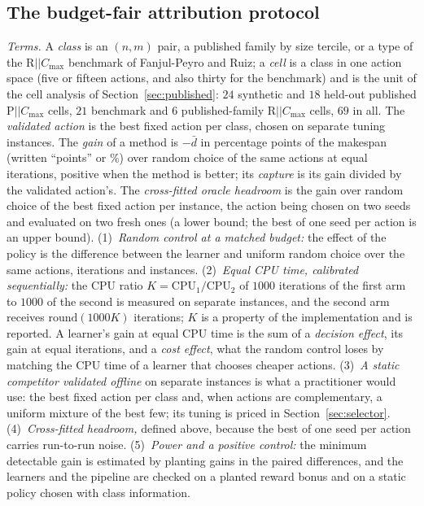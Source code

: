 \documentclass[conference,a4paper]{IEEEtran}
\newcommand{\Cmax}{C_{\max}}
\begin{document}
\subsection{The budget-fair attribution protocol}
\label{sec:protocol}
\emph{Terms.} A \emph{class} is an $(n,m)$ pair, a published family by size tercile, or a type of the R$||\Cmax$ benchmark of Fanjul-Peyro and Ruiz; a \emph{cell} is a class in one action space (five or fifteen actions, and also thirty for the benchmark) and is the unit of the cell analysis of Section~\ref{sec:published}: $24$ synthetic and $18$ held-out published P$||\Cmax$ cells, $21$ benchmark and $6$ published-family R$||\Cmax$ cells, $69$ in all.
The \emph{validated action} is the best fixed action per class, chosen on separate tuning instances. The \emph{gain} of a method is $-\bar d$ in percentage points of the makespan (written ``points'' or $\%$) over random choice of the same actions at equal iterations, positive when the method is better; its \emph{capture} is its gain divided by the validated action's.
The \emph{cross-fitted oracle headroom} is the gain over random choice of the best fixed action per instance, the action being chosen on two seeds and evaluated on two fresh ones (a lower bound; the best of one seed per action is an upper bound).
(1)~\emph{Random control at a matched budget:} the effect of the policy is the difference between the learner and uniform random choice over the same actions, iterations and instances.
(2)~\emph{Equal CPU time, calibrated sequentially:} the CPU ratio $K=\mathrm{CPU}_1/\mathrm{CPU}_2$ of $1000$ iterations of the first arm to $1000$ of the second is measured on separate instances, and the second arm receives $\mathrm{round}(1000K)$ iterations; $K$ is a property of the implementation and is reported. A learner's gain at equal CPU time is the sum of a \emph{decision effect}, its gain at equal iterations, and a \emph{cost effect}, what the random control loses by matching the CPU time of a learner that chooses cheaper actions.
(3)~\emph{A static competitor validated offline} on separate instances is what a practitioner would use: the best fixed action per class and, when actions are complementary, a uniform mixture of the best few; its tuning is priced in Section~\ref{sec:selector}.
(4)~\emph{Cross-fitted headroom,} defined above, because the best of one seed per action carries run-to-run noise.
(5)~\emph{Power and a positive control:} the minimum detectable gain is estimated by planting gains in the paired differences, and the learners and the pipeline are checked on a planted reward bonus and on a static policy chosen with class information.
\end{document}
